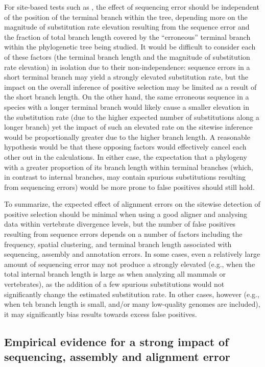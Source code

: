 For site-based tests such as \slr, the effect of sequencing error
should be independent of the position of the terminal branch within
the tree, depending more on the magnitude of \nsyn substitution rate
elevation resulting from the sequence error and the fraction of total
branch length covered by the ``erroneous'' terminal branch within the
phylogenetic tree being studied. It would be difficult to consider
each of these factors (the terminal branch length and the magnitude of
\nsyn substitution rate elevation) in isolation due to their
non-independence: sequence errors in a short terminal branch may yield
a strongly elevated \nsyn substitution rate, but the impact on the
overall inference of positive selection may be limited as a result of
the short branch length. On the other hand, the same erroneous
sequence in a species with a longer terminal branch would likely cause
a smaller elevation in the \nsyn substitution rate (due to the higher
expected number of substitutions along a longer branch) yet the impact
of such an elevated rate on the sitewise inference would be
proportionally greater due to the higher branch length. A reasonable
hypothesis would be that these opposing factors would effectively
cancel each other out in the \ml calculations. In either case, the
expectation that a phylogeny with a greater proportion of its branch
length within terminal branches (which, in contrast to internal
branches, may contain spurious substitutions resulting from sequencing
errors) would be more prone to false positives should still hold.

To summarize, the expected effect of alignment errors on the sitewise
detection of positive selection should be minimal when using a good
aligner and analysing data within vertebrate divergence levels, but
the number of false positives resulting from sequence errors depends
on a number of factors including the frequency, spatial clustering,
and terminal branch length associated with sequencing, assembly and
annotation errors. In some cases, even a relatively large amount of
sequencing error may not produce a strongly elevated \fpr (e.g., when
the total internal branch length is large as when analyzing all
mammals or vertebrates), as the addition of a few spurious
substitutions would not significantly change the estimated \nsyn
substitution rate. In other cases, however (e.g., when teh branch
length is small, and/or many low-quality genomes are included), it may
significantly bias results towards excess false positives.

\subsection{Empirical evidence for a strong impact of sequencing, assembly and alignment error}

